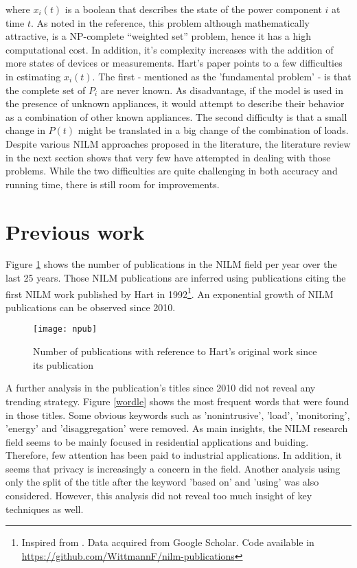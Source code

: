 where $x_i(t)$ is a boolean that describes the state of the power component $i$ at time $t$. As noted in the reference, this problem although mathematically attractive, is a NP-complete “weighted set” problem, hence it has a high computational cost. In addition, it's complexity increases with the addition of more states of devices or measurements.
Hart's paper points to a few difficulties in estimating $x_i(t)$. The first - mentioned as the 'fundamental problem' - is that the complete set of $P_i$ are never known. As disadvantage, if the model is used in the presence of unknown appliances, it would attempt to describe their behavior as a combination of other known appliances. 
The second difficulty is that a small change in $P(t)$ might be translated in a big change of the combination of loads. Despite various NILM approaches proposed in the literature, the literature review in the next section shows that very few have attempted in dealing with those problems. While the two difficulties are quite challenging in both accuracy and running time, there is still room for improvements. 

\fi

\section{Previous work}

Figure \ref{1npub} shows the number of publications in the NILM field per year over the last 25 years. Those NILM publications are inferred using publications citing the first NILM work published by Hart in 1992\footnote{Inspired from \cite{1npub}. Data acquired from Google Scholar. Code available in \url{https://github.com/WittmannF/nilm-publications}}. An exponential growth of NILM publications can be observed since 2010.

\begin{figure}[bt]
    \centering
    \texttt{[image: npub]}
    \caption{Number of publications with reference to Hart's original work since its publication}
    \label{1npub}
\end{figure}


A further analysis in the publication's titles since 2010 did not reveal any trending strategy. Figure \ref{wordle} shows the most frequent words that were found in those titles. Some obvious keywords such as 'nonintrusive', 'load', 'monitoring', 'energy' and 'disaggregation' were removed. As main insights, the NILM research field seems to be mainly focused in residential applications and buiding. Therefore, few attention has been paid to industrial applications. In addition, it seems that privacy is increasingly a concern in the field. Another analysis using only the split of the title after the keyword 'based on' and 'using' was also considered. However, this analysis did not reveal too much insight of key techniques as well. 

